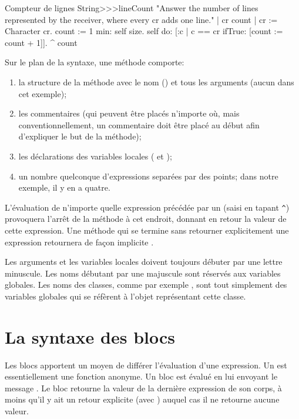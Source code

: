 \documentclass[a4paper,10pt,twoside]{book}
\begin{document}
\begin{method}[lineCount]{Compteur de lignes}
String>>>lineCount
   "Answer the number of lines represented by the receiver,
   where every cr adds one line."
   | cr count |
   cr := Character cr.
   count := 1  min: self size.
   self do:
      [:c | c == cr ifTrue: [count := count + 1]].
   ^ count
\end{method}

Sur le plan de la syntaxe, une m\'{e}thode comporte:
\begin{enumerate}
  \item la structure de la m\'{e}thode avec le nom (\ie {}) et tous les arguments (aucun dans cet exemple);
  \item les commentaires (qui peuvent \^{e}tre plac\'{e}s n'importe
    o\`{u}, mais conventionnellement, un commentaire doit \^{e}tre plac\'{e} au d\'{e}but afin d'expliquer le but de la m\'{e}thode);
  \item les d\'{e}clarations des variables locales (\ie {} et
    ); 
  \item un nombre quelconque d'expressions separ\'{e}es par des points; dans notre exemple, il y en a quatre.
\end{enumerate}

L'\'{e}valuation de n'importe quelle expression pr\'{e}c\'{e}d\'{e}e
par un \ct{^} (saisi en tapant \verb|^|) provoquera l'arr\^{e}t de la m\'{e}thode \`{a} cet endroit, donnant en retour la valeur de cette expression.
Une m\'{e}thode qui se termine sans retourner explicitement une expression retournera de fa\c{c}on implicite .


Les arguments et les variables locales doivent toujours d\'{e}buter par une lettre minuscule.
Les noms d\'{e}butant par une majuscule sont r\'{e}servés aux variables globales.
Les noms des classes, comme par exemple , sont tout
simplement des variables globales qui se réfèrent à l'objet repr\'{e}sentant cette classe.

\section{La syntaxe des blocs}

Les blocs apportent un moyen de diff\'{e}rer l'\'{e}valuation d'une expression.
Un  est essentiellement une fonction anonyme. Un bloc est \'{e}valu\'{e} en lui envoyant le message .
Le bloc retourne la valeur de la derni\`{e}re expression de son corps,
\`{a} moins qu'il y ait un retour explicite (avec \ct{^}) auquel cas il ne retourne aucune valeur.
\end{document}
